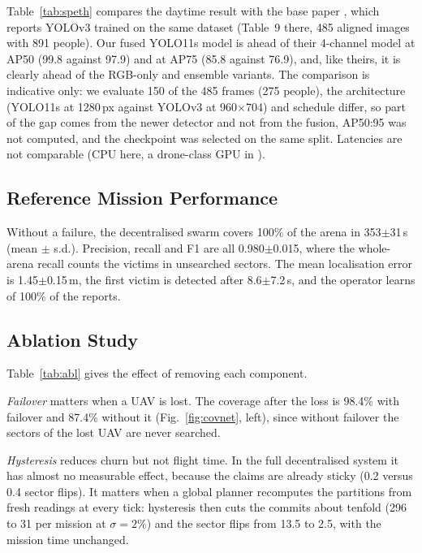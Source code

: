 \documentclass[10pt,a4paper,twocolumn]{article}
\newcommand{\pmsd}[2]{#1{\small$\pm$#2}}
\begin{document}
Table~\ref{tab:speth} compares the daytime result with the base paper \cite{speth2022}, which reports YOLOv3 trained on the same dataset (Table~9 there, 485 aligned images with 891 people). Our fused YOLO11s model is ahead of their 4-channel model at AP50 (99.8 against 97.9) and at AP75 (85.8 against 76.9), and, like theirs, it is clearly ahead of the RGB-only and ensemble variants. The comparison is indicative only: we evaluate 150 of the 485 frames (275 people), the architecture (YOLO11s at 1280\,px against YOLOv3 at 960$\times$704) and schedule differ, so part of the gap comes from the newer detector and not from the fusion, AP50:95 was not computed, and the checkpoint was selected on the same split. Latencies are not comparable (CPU here, a drone-class GPU in \cite{speth2022}).





\subsection{Reference Mission Performance}
Without a failure, the decentralised swarm covers 100\% of the arena in \pmsd{353}{31}\,s (mean $\pm$ s.d.). Precision, recall and F1 are all \pmsd{0.980}{0.015}, where the whole-arena recall counts the victims in unsearched sectors. The mean localisation error is \pmsd{1.45}{0.15}\,m, the first victim is detected after \pmsd{8.6}{7.2}\,s, and the operator learns of 100\% of the reports.



\subsection{Ablation Study}
Table~\ref{tab:abl} gives the effect of removing each component.


\emph{Failover} matters when a UAV is lost. The coverage after the loss is 98.4\% with failover and 87.4\% without it (Fig.~\ref{fig:covnet}, left), since without failover the sectors of the lost UAV are never searched.

\emph{Hysteresis} reduces churn but not flight time. In the full decentralised system it has almost no measurable effect, because the claims are already sticky (0.2 versus 0.4 sector flips). It matters when a global planner recomputes the partitions from fresh readings at every tick: hysteresis then cuts the commits about tenfold (296 to 31 per mission at $\sigma=2\%$) and the sector flips from 13.5 to 2.5, with the mission time unchanged.
\end{document}
